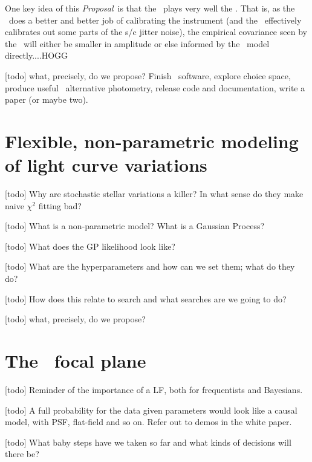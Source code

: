 \documentclass[letterpaper,12pt,preprint]{hack_aastex}
\newcommand{\documentname}{\textsl{Proposal}}
\begin{document}
One key idea of this \documentname\ is that the \OWL\ plays very well the \PLM.
That is, as the \PLM\ does a better and better job of calibrating the
instrument (and the \PLM\ effectively calibrates out some parts of the s/c
jitter noise), the empirical covariance seen by the \OWL\ will either be
smaller in amplitude or else informed by the \PLM\ model directly....HOGG

[todo] what, precisely, do we propose?  Finish \OWL\ software, explore choice space, produce useful \Kepler\ alternative photometry, release code and documentation, write a paper (or maybe two).

\section{Flexible, non-parametric modeling of light curve variations}

[todo] Why are stochastic stellar variations a killer?  In what sense do they make naive $\chi^2$ fitting bad?

[todo] What is a non-parametric model?  What is a Gaussian Process?

[todo] What does the GP likelihood look like?

[todo] What are the hyperparameters and how can we set them; what do they do?

[todo] How does this relate to search and what searches are we going to do?

[todo] what, precisely, do we propose?


\section{The \Kepler\ focal plane}

[todo] Reminder of the importance of a LF, both for frequentists and Bayesians.

[todo] A full probability for the data given parameters would look like a causal model, with PSF, flat-field and so on.  Refer out to demos in the white paper.

[todo] What baby steps have we taken so far and what kinds of decisions will there be?
\end{document}
